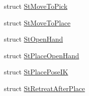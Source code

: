 \begin{DoxyCompactItemize}
struct \hyperlink{structsm__mtc__picknplace_1_1StMoveToPick}{St\+Move\+To\+Pick}
\item 
struct \hyperlink{structsm__mtc__picknplace_1_1StMoveToPlace}{St\+Move\+To\+Place}
\item 
struct \hyperlink{structsm__mtc__picknplace_1_1StOpenHand}{St\+Open\+Hand}
\item 
struct \hyperlink{structsm__mtc__picknplace_1_1StPlaceOpenHand}{St\+Place\+Open\+Hand}
\item 
struct \hyperlink{structsm__mtc__picknplace_1_1StPlacePoseIK}{St\+Place\+Pose\+IK}
\item 
struct \hyperlink{structsm__mtc__picknplace_1_1StRetreatAfterPlace}{St\+Retreat\+After\+Place}
\end{DoxyCompactItemize}
